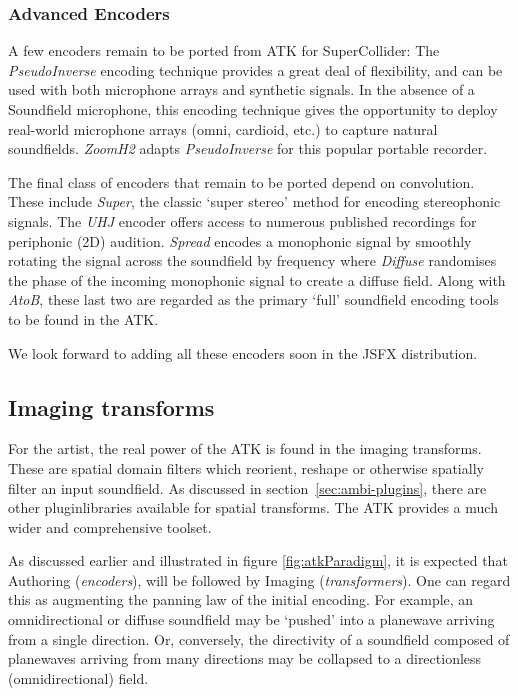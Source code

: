 \documentclass{article}
\begin{document}
\subsubsection{Advanced Encoders}\label{sec:impending-encoders}

A few encoders remain to be ported from ATK for SuperCollider:
The \emph{PseudoInverse} encoding technique provides a great deal of flexibility, and can be used with both microphone arrays and synthetic signals. 
In the absence of a Soundfield microphone, this encoding technique gives the opportunity to deploy real-world microphone arrays (omni, cardioid, etc.) to capture natural soundfields.
\emph{Zoom\-H2} adapts \emph{PseudoInverse} for this popular portable recorder.

The final class of encoders that remain to be ported depend on convolution.
These include \emph{Super}, the classic `super stereo' method for encoding stereophonic signals. The \emph{UHJ} encoder offers access to numerous published recordings for periphonic (2D) audition. \emph{Spread} encodes a monophonic signal by smoothly rotating the signal across the soundfield by frequency where \emph{Diffuse} randomises the phase of the incoming monophonic signal to create a diffuse field.
Along with \emph{AtoB}, these last two are regarded as the primary `full' soundfield encoding tools to be found in the ATK.

We look forward to adding all these encoders soon in the JSFX distribution.



\subsection{Imaging transforms}\label{sec:transforms}

For the artist, the real power of the ATK is found in the imaging transforms.
These are spatial domain filters which reorient, reshape or otherwise spatially filter an input soundfield.
As discussed in section~\ref{sec:ambi-plugins}, there are other plugin\linebreak libraries available for spatial transforms.
The ATK provides a much wider and comprehensive toolset.

As discussed earlier and illustrated in figure \ref{fig:atkParadigm}, it is expected that Authoring (\emph{encoders}), will be followed by Imaging (\emph{transformers}).
One can regard this as augmenting the panning law of the initial encoding. For example, an omni\-directional or diffuse soundfield may be `pushed' into a planewave arriving from a single direction.
Or, conversely, the directivity of a soundfield composed of planewaves arriving from many directions may be collapsed to a direct\-ionless (omnidirectional) field.
\end{document}
